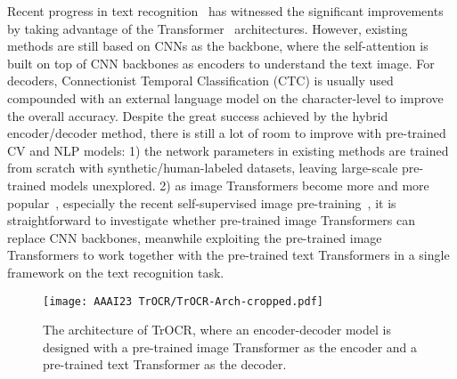 \documentclass[letterpaper]{article} \usepackage{aaai23}  \usepackage{times}  \usepackage{helvet}  \usepackage{courier}  \usepackage[hyphens]{url}  \usepackage{graphicx} \urlstyle{rm} \def\UrlFont{\rm}  \usepackage{natbib}  \usepackage{caption} \frenchspacing  \setlength{\pdfpagewidth}{8.5in} \setlength{\pdfpageheight}{11in} \usepackage{algorithm}
\begin{document}
Recent progress in text recognition~\citep{diaz2021rethinking} has witnessed the significant improvements by taking advantage of the Transformer~\cite{vaswani2017attention} architectures. However, existing methods are still based on CNNs as the backbone, where the self-attention is built on top of CNN backbones as encoders to understand the text image. For decoders, Connectionist Temporal Classification (CTC) \cite{graves2006connectionist} is usually used compounded with an external language model on the character-level to improve the overall accuracy. Despite the great success achieved by the hybrid encoder/decoder method, there is still a lot of room to improve with pre-trained CV and NLP models: 1) the network parameters in existing methods are trained from scratch with synthetic/human-labeled datasets, leaving large-scale pre-trained models unexplored. 2) as image Transformers become more and more popular~\citep{dosovitskiy2020vit,touvron2020deit}, especially the recent self-supervised image pre-training~\citep{bao2021beit}, it is straightforward to investigate whether pre-trained image Transformers can replace CNN backbones, meanwhile exploiting the pre-trained image Transformers to work together with the pre-trained text Transformers in a single framework on the text recognition task. 

\begin{figure*}[t]
\centering
\texttt{[image: AAAI23 TrOCR/TrOCR-Arch-cropped.pdf]}
\caption{The architecture of TrOCR, where an encoder-decoder model is designed with a pre-trained image Transformer as the encoder and a pre-trained text Transformer as the decoder.}
\label{fig:model}
\end{figure*}
\end{document}
